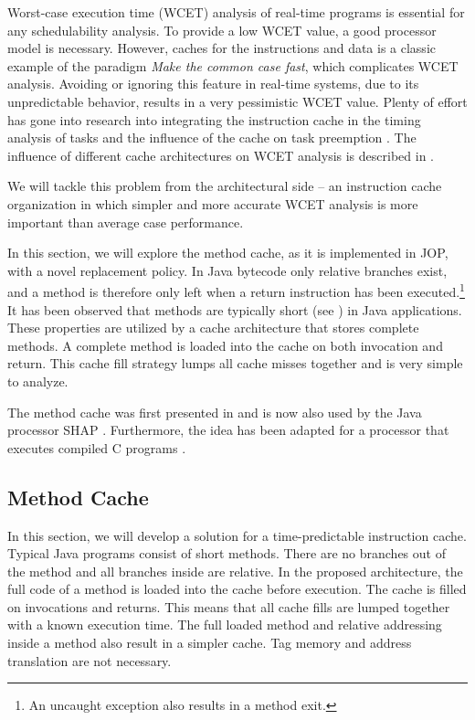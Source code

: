 \label{sec:cache}


Worst-case execution time (WCET) analysis \cite{pusch:maxt:jnl} of
real-time programs is essential for any schedulability analysis. To
provide a low WCET value, a good processor model is necessary.
However, caches for the instructions and data is a classic example of
the paradigm \emph{Make the common case fast}, which complicates WCET
analysis. Avoiding or ignoring this feature in real-time systems, due
to its unpredictable behavior, results in a very pessimistic WCET
value. Plenty of effort has gone into research into integrating the
instruction cache in the timing analysis of tasks \cite{Arnold1994,
Healy1995, 225068} and the influence of the cache on task preemption
\cite{279589, Mataix:1996}. The influence of different cache
architectures on WCET analysis is described in
\cite{Heckmann:IEEE2003}.

We will tackle this problem from the architectural side -- an
instruction cache organization in which simpler and more accurate
WCET analysis is more important than average case performance.

In this section, we will explore the method cache, as it is
implemented in JOP, with a novel replacement policy. In Java bytecode
only relative branches exist, and a method is therefore only left
when a return instruction has been executed.\footnote{An uncaught
exception also results in a method exit.} It has been observed that
methods are typically short (see \cite{jop:thesis}) in Java
applications. These properties are utilized by a cache architecture
that stores complete methods. A complete method is loaded into the
cache on both invocation and return. This cache fill strategy lumps
all cache misses together and is very simple to analyze.

The method cache was first presented in \cite{jop:jtres_cache} and is
now also used by the Java processor SHAP \cite{shap:mcache}.
Furthermore, the idea has been adapted for a processor that executes
compiled C programs \cite{Metzlaff:SPM:2008}.

\subsection{Method Cache}

In this section, we will develop a solution for a time-predictable
instruction cache. Typical Java programs consist of short methods.
There are no branches out of the method and all branches inside are
relative. In the proposed architecture, the full code of a method is
loaded into the cache before execution. The cache is filled on
invocations and returns. This means that all cache fills are lumped
together with a known execution time. The full loaded method and
relative addressing inside a method also result in a simpler cache.
Tag memory and address translation are not necessary.

